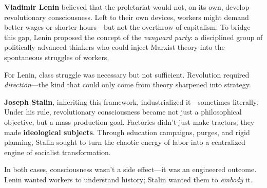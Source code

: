 \begin{tcolorbox}[colback=gray!5!white, colframe=black!80!white, title={Historical Sidenote: Lenin, Stalin, and the Machinery of Revolutionary Consciousness}]
  \textbf{Vladimir Lenin} believed that the proletariat would not, on its own, develop revolutionary consciousness. Left to their own devices, workers might demand better wages or shorter hours—but not the overthrow of capitalism. To bridge this gap, Lenin proposed the concept of the \emph{vanguard party}: a disciplined group of politically advanced thinkers who could inject Marxist theory into the spontaneous struggles of workers.  
  
  For Lenin, class struggle was necessary but not sufficient. Revolution required \emph{direction}—the kind that could only come from theory sharpened into strategy.  
  
  \medskip
  
  \textbf{Joseph Stalin}, inheriting this framework, industrialized it—sometimes literally. Under his rule, revolutionary consciousness became not just a philosophical objective, but a mass production goal. Factories didn’t just make tractors; they made \textbf{ideological subjects}. Through education campaigns, purges, and rigid planning, Stalin sought to turn the chaotic energy of labor into a centralized engine of socialist transformation.  
  
  \medskip
  
  In both cases, consciousness wasn’t a side effect—it was an engineered outcome. Lenin wanted workers to understand history; Stalin wanted them to \emph{embody} it.
\end{tcolorbox}

\vspace{1em}

